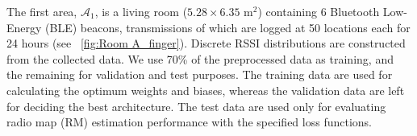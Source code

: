 \documentclass[conference]{IEEEtran}
\newcommand{\x}{\mathbf{x}}
\newcommand{\bea}{\mathbf{b}}
\begin{document}
{	%
	The first area, $\mathcal{A}_1$, is a living room ($5.28\times6.35$ m$^2$) containing 6 Bluetooth Low-Energy (BLE) beacons, transmissions of which are logged at 50 locations each for 24 hours \cite{Ser2017} (see \figurename~\ref{fig:Room A_finger}). Discrete RSSI distributions are constructed from the collected data. We use 70\% of the preprocessed data as training, and the remaining for validation and test purposes. The training data are used for calculating the optimum weights and biases, whereas the validation data are left for deciding the best architecture. The test data are used only for evaluating radio map (RM) estimation performance with the specified loss functions. 
}
\end{document}
